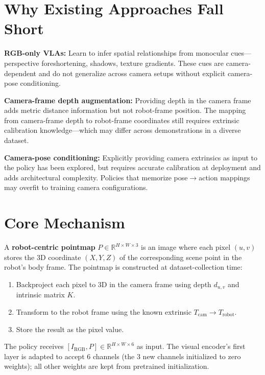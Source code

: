 \documentclass[10pt,twocolumn]{article}
\begin{document}
\section{Why Existing Approaches Fall Short}

\textbf{RGB-only VLAs:} Learn to infer spatial relationships from
monocular cues---perspective foreshortening, shadows, texture gradients.
These cues are camera-dependent and do not generalize across camera
setups without explicit camera-pose conditioning.

\textbf{Camera-frame depth augmentation:} Providing depth in the
camera frame adds metric distance information but not robot-frame
position. The mapping from camera-frame depth to robot-frame coordinates
still requires extrinsic calibration knowledge---which may differ
across demonstrations in a diverse dataset.

\textbf{Camera-pose conditioning:} Explicitly providing camera
extrinsics as input to the policy has been explored, but requires
accurate calibration at deployment and adds architectural complexity.
Policies that memorize pose$\to$action mappings may overfit to
training camera configurations.

\section{Core Mechanism}

A \textbf{robot-centric pointmap} $P \in \mathbb{R}^{H \times W \times 3}$
is an image where each pixel $(u, v)$ stores the 3D coordinate
$(X, Y, Z)$ of the corresponding scene point in the robot's
body frame. The pointmap is constructed at dataset-collection time:

\begin{enumerate}[itemsep=2pt,parsep=0pt]
  \item Backproject each pixel to 3D in the camera frame using depth
    $d_{u,v}$ and intrinsic matrix $K$.
  \item Transform to the robot frame using the known extrinsic
    $T_\text{cam} \to T_\text{robot}$.
  \item Store the result as the pixel value.
\end{enumerate}

The policy receives $[I_\text{RGB}, P] \in \mathbb{R}^{H \times W \times 6}$
as input. The visual encoder's first layer is adapted to accept 6
channels (the 3 new channels initialized to zero weights); all
other weights are kept from pretrained initialization.
\end{document}
